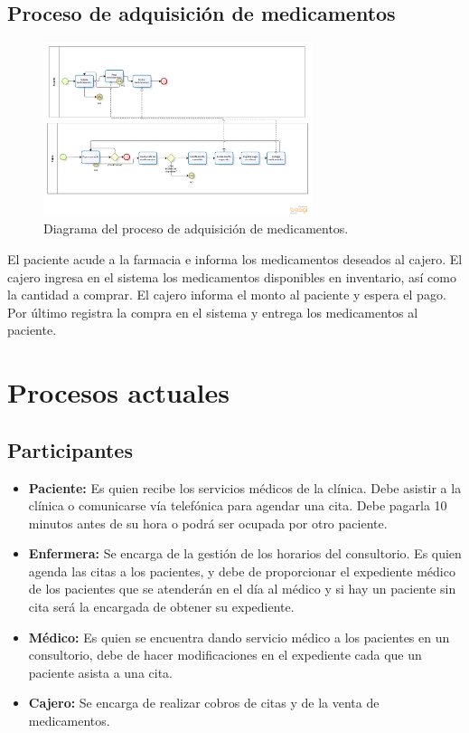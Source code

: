     \subsection{Proceso de adquisición de medicamentos}
\begin{figure}[htbp!]
		\centering
			\includegraphics[width=0.7\textwidth]{images/procesos/medicamentos}
		\caption{Diagrama del proceso de adquisición de medicamentos.}
	\end{figure}
	El paciente acude a la farmacia e informa los medicamentos deseados al cajero. El cajero ingresa en el sistema los medicamentos disponibles en inventario, así como la cantidad a comprar. El cajero informa el monto al paciente y espera el pago. Por último registra la compra en el sistema y entrega los medicamentos al paciente.
\newpage
\section{Procesos actuales}

\subsection{Participantes}

\begin{itemize}
	\item \textbf{Paciente: }Es quien recibe los servicios médicos de la clínica. Debe asistir a la clínica o comunicarse vía telefónica para agendar una cita. Debe pagarla 10 minutos antes de su hora o podrá ser ocupada por otro paciente.
    \item \textbf{Enfermera: }Se encarga de la gestión de los horarios del consultorio. Es quien agenda las citas a los pacientes, y debe de proporcionar el expediente médico de los pacientes que se atenderán en el día al médico y si hay un paciente sin cita será la encargada de obtener su expediente.
    \item \textbf{Médico: }Es quien se encuentra dando servicio médico a los pacientes en un consultorio, debe de hacer modificaciones en el expediente cada que un paciente asista a una cita.
    \item \textbf{Cajero: }Se encarga de realizar cobros de citas y de la venta de medicamentos.
\end{itemize}
